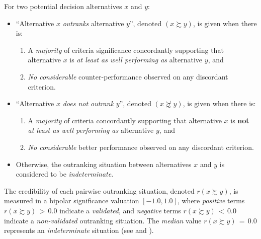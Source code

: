 \begin{definition}\label{def:outranking}

\noindent For two potential decision alternatives $x$ and $y$:
\begin{itemize}[leftmargin=0.5cm,rightmargin=0.5cm]
\item ``Alternative $x$ \emph{outranks} alternative $y$'', denoted $(x \succsim y)$, is given when there is:
   \begin{enumerate}
     \item A \emph{majority} of criteria significance concordantly supporting that alternative $x$ is \emph{at least as well performing as} alternative $y$, and
     \item \emph{No considerable} counter-performance observed on any discordant criterion.      
    \end{enumerate}
\item ``Alternative $x$ \emph{does not outrank} $y$'', denoted $(x \not\succsim y)$, is given when there is:
   \begin{enumerate}
    \item A \emph{majority} of criteria concordantly supporting that alternative $x$ is \textbf{not} \emph{at least as well performing as} alternative $y$, and
    \item \emph{No considerable} better performance observed on any discordant criterion. 
    \end{enumerate}
\item Otherwise, the outranking situation between alternatives $x$ and $y$ is considered to be \emph{indeterminate}.
\end{itemize}
\end{definition}
The credibility of each pairwise outranking situation, denoted $r(x \succsim y)$, is measured in a bipolar significance valuation $[-1.0, 1.0]$, where \emph{positive} terms $r(x \succsim y)\, >\, 0.0$ indicate a \emph{validated}, and \emph{negative} terms $r(x \succsim y)\, <\, 0.0$ indicate a \emph{non-validated} outranking situation. The \emph{median} value $r(x \succsim y)\, = \,0.0$ represents an \emph{indeterminate} situation (see \citet{BIS-2004a} and \citet{BIS-2013}).   

